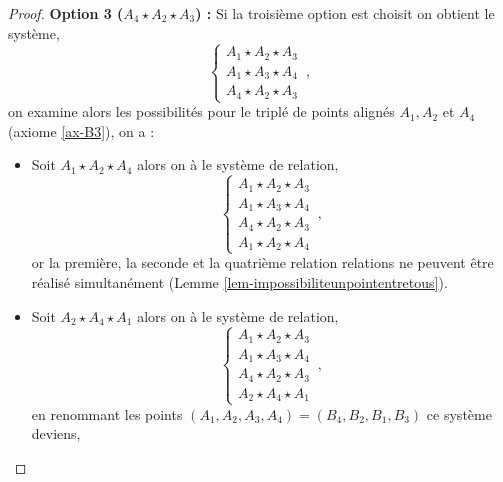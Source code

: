 \begin{cor}
\begin{proof}
        \textbf{Option 3 ($A_4 \star A_2 \star A_3$) :} Si la troisième option est choisit on obtient le système,
        \begin{equation*}
        \left\{
            \begin{array}{c}
                 A_1 \star A_2 \star A_3 \\
                 A_1 \star A_3 \star A_4 \\
                 A_4 \star A_2 \star A_3 
            \end{array}
            \right. \,,
        \end{equation*}
        on examine alors les possibilités pour le triplé de points alignés $A_1,A_2$ et $A_4$ (axiome \ref{ax-B3}), on a :
        \begin{itemize}[$\bullet$]
            \item Soit $A_1 \star A_2 \star A_4$ alors on à le système de relation,
            \begin{equation*}
            \left\{
            \begin{array}{c}
                 A_1 \star A_2 \star A_3 \\
                 A_1 \star A_3 \star A_4 \\
                 A_4 \star A_2 \star A_3 \\
                 A_1 \star A_2 \star A_4
            \end{array}
            \right. \,,    
            \end{equation*}
            or la première, la seconde et la quatrième relation relations ne peuvent être réalisé simultanément (Lemme \ref{lem-impossibiliteunpointentretous}). 
            \item Soit $A_2 \star A_4 \star A_1$ alors on à le système de relation,
            \begin{equation*}
            \left\{
            \begin{array}{c}
                 A_1 \star A_2 \star A_3 \\
                 A_1 \star A_3 \star A_4 \\
                 A_4 \star A_2 \star A_3 \\
                 A_2 \star A_4 \star A_1
            \end{array}
            \right. \,,    
            \end{equation*}
            en renommant les points $(A_1,A_2,A_3,A_4)=(B_4,B_2,B_1,B_3)$ ce système deviens,
            \begin{equation*}

\end{equation*}
\end{itemize}
\end{proof}
\end{cor}

